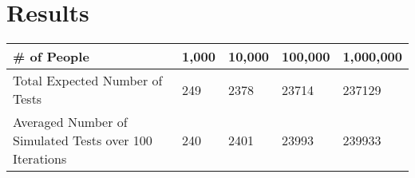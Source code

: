 \documentclass{article}
\begin{document}
\section{Results}
\begin{table}[h]
\begin{tabular}{|l|l|l|l|l|}
\hline
\# of People                                           & 1,000 & 10,000 & 100,000 & 1,000,000 \\ \hline
Total Expected Number of Tests                         & 249   & 2378   & 23714   & 237129    \\ \hline
Averaged Number of Simulated Tests over 100 Iterations & 240   & 2401   & 23993   & 239933    \\ \hline
\end{tabular}
\end{table}
\end{document}
